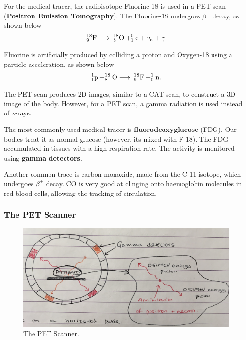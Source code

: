 For the medical tracer, the radioisotope Fluorine-18 is used in a PET scan (\textbf{Positron Emission Tomography}). The Fluorine-18 undergoes $\beta^+$ decay, as shown below
\begin{equation}
    _{9}^{18}\text{F} \longrightarrow \hspace{1mm} _{8}^{18}\text{O} + _{1}^{0}\text{e} + v_e + \gamma
\end{equation}

Fluorine is artificially produced by colliding a proton and Oxygen-18 using a particle acceleration, as shown below
\begin{equation}
    _1^1\text{p} + _8^{18}\text{O} \longrightarrow \hspace{1mm} _9^{18}\text{F} + _0^1\text{n}.
\end{equation}

The PET scan produces 2D images, similar to a CAT scan, to construct a 3D image of the body. However, for a PET scan, a gamma radiation is used instead of x-rays. 

The most commonly used medical tracer is \textbf{fluorodeoxyglucose} (FDG). Our bodies treat it as normal glucose (however, its mixed with F-18). The FDG accumulated in tissues with a high respiration rate. The activity is monitored using \textbf{gamma detectors}.

Another common trace is carbon monoxide, made from the C-11 isotope, which undergoes $\beta^+$ decay. CO is very good at clinging onto haemoglobin molecules in red blood cells, allowing the tracking of circulation. 

\subsubsection*{The PET Scanner}

\begin{figure}[h!]
    \centering
    \includegraphics[scale=0.1]{notes/images/Pet-Scanner.JPG}
    \caption{The PET Scanner.}
\end{figure}
\FloatBarrier

